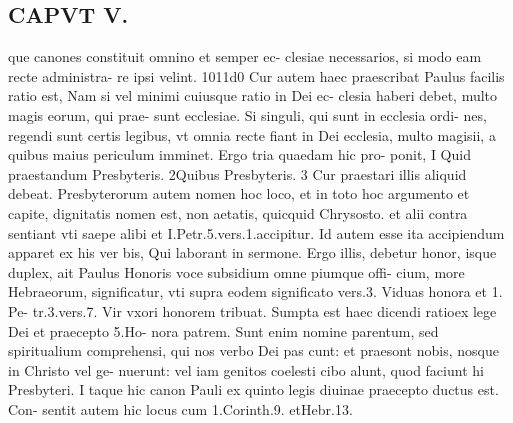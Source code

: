 \documentclass{article}
\begin{document}
\begin{pages}
\section*{CAPVT  V. }\pstart que canones constituit omnino et semper ec- clesiae necessarios, si modo eam recte administra- re ipsi velint. 1011d0 Cur autem haec praescribat Paulus facilis ratio est, Nam si vel minimi cuiusque ratio in Dei ec- clesia haberi debet, multo magis eorum, qui prae- sunt ecclesiae. Si singuli, qui sunt in ecclesia ordi- nes, regendi sunt certis legibus, vt omnia recte fiant in Dei ecclesia, multo magisii, a quibus maius periculum imminet. Ergo tria quaedam hic pro- ponit, I Quid praestandum Presbyteris. 2Quibus Presbyteris. 3 Cur praestari illis aliquid debeat. Presbyterorum autem nomen hoc loco, et in toto hoc argumento et capite, dignitatis nomen est, non aetatis, quicquid Chrysosto. et alii contra sentiant vti saepe alibi et I.Petr.5.vers.1.accipitur. Id autem esse ita accipiendum apparet ex his ver bis, Qui laborant in sermone. Ergo illis, debetur honor, isque duplex, ait Paulus Honoris voce subsidium omne piumque offi- cium, more Hebraeorum, significatur, vti supra eodem significato vers.3. Viduas honora et 1. Pe- tr.3.vers.7. Vir vxori honorem tribuat. Sumpta est haec dicendi ratioex lege Dei et praecepto 5.Ho- nora patrem. Sunt enim nomine parentum, sed spiritualium comprehensi, qui nos verbo Dei pas cunt: et praesont nobis, nosque in Christo vel ge- nuerunt: vel iam genitos coelesti cibo alunt, quod faciunt hi Presbyteri. I taque hic canon Pauli ex quinto legis diuinae praecepto ductus est. Con- sentit autem hic locus cum 1.Corinth.9. etHebr.13.  \pend

\end{pages}
\end{document}

